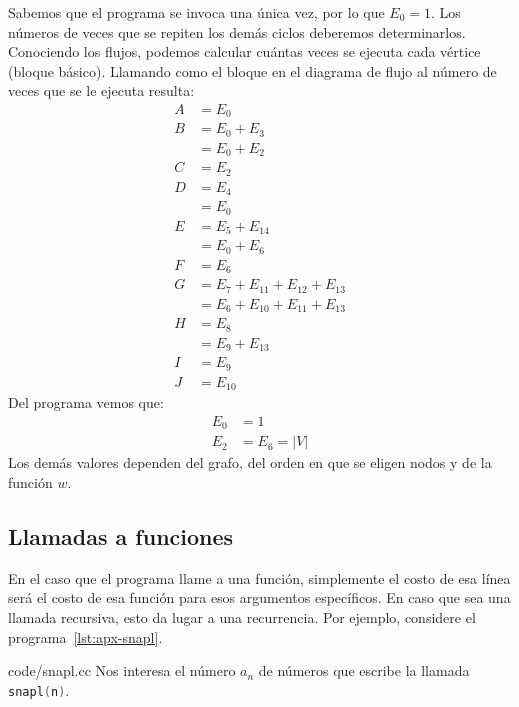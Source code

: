   Sabemos que el programa se invoca una única vez,
  por lo que \(E_0 = 1\).
  Los números de veces que se repiten los demás ciclos
  deberemos determinarlos.
  Conociendo los flujos,
  podemos calcular cuántas veces se ejecuta cada vértice
  (bloque básico).
  Llamando como el bloque en el diagrama de flujo
  al número de veces que se le ejecuta resulta:
  \begin{align*}
    A
      &= E_0 \\
    B
      &= E_0 + E_3 \\
      &= E_0 + E_2 \\
    C
      &= E_2 \\
    D
      &= E_4 \\
      &= E_0 \\
    E
      &= E_5 + E_{14} \\
      &= E_0 + E_6 \\
    F
      &= E_6 \\
    G
      &= E_7 + E_{11} + E_{12} + E_{13} \\
      &= E_6 + E_{10} + E_{11} + E_{13} \\
    H
      &= E_8 \\
      &= E_9 + E_{13} \\
    I
      &= E_9 \\
    J
      &= E_{10}
  \end{align*}
  Del programa vemos que:
  \begin{align*}
    E_0
      &= 1 \\
    E_2
      &= E_6 = \lvert V \rvert
  \end{align*}
  Los demás valores dependen del grafo,
  del orden en que se eligen nodos
  y de la función \(w\).

\subsection{Llamadas a funciones}
\label{sec:llamadas-funciones}

  En el caso que el programa llame a una función,
  simplemente el costo de esa línea será el costo de esa función
  para esos argumentos específicos.
  En caso que sea una llamada recursiva,
  esto da lugar a una recurrencia.
  Por ejemplo,
  considere el programa~\ref{lst:apx-snapl}.
  
                  {code/snapl.cc}
  Nos interesa el número \(a_n\) de números
  que escribe la llamada \lstinline[language = C++]!snapl(n)!.

